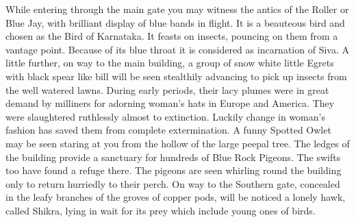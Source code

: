 \medskip
{}
While entering through the main gate you may witness the antics of 
the Roller or Blue Jay, with brilliant display of blue bands in flight. It is a 
beauteous bird and chosen as the Bird of Karnataka. It feasts on insects, 
pouncing on them from a vantage point. Because of its blue throat it is 
considered as incarnation of Siva. A little further, on way to the main 
building, a group of snow white little Egrets with black spear like bill will be 
seen stealthily advancing to pick up insects from the well watered lawns. 
During early periods, their lacy plumes were in great demand by milliners 
for adorning woman's hats in Europe and America. They were slaughtered 
ruthlessly almost to extinction. Luckily change in woman's fashion has 
saved them from complete extermination. A funny Spotted Owlet may be 
seen staring at you from the hollow of the large peepal tree. The ledges of 
the building provide a sanctuary for hundreds of Blue Rock Pigeons. The 
swifts too have found a refuge there. The pigeons are seen whirling round 
the building only to return hurriedly to their perch. On way to the Southern 
gate, concealed in the leafy branches of the groves of copper pods, will be 
noticed a lonely hawk, called Shikra, lying in wait for its prey which include 
young ones of birds. 

